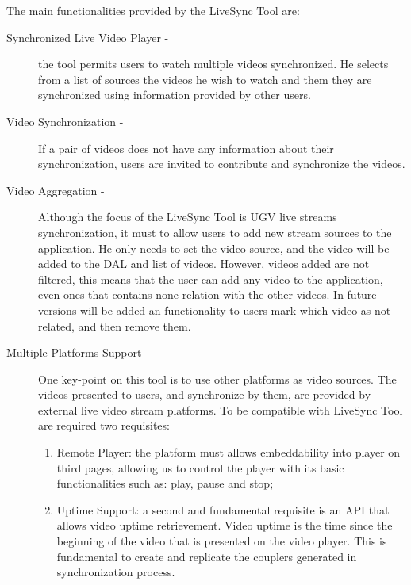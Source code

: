 The main functionalities provided by the LiveSync Tool are:

\begin{description}
	\item[Synchronized Live Video Player -]	the tool permits users to watch multiple videos synchronized. He selects from a list of sources the videos he wish to watch and them they are synchronized using information provided by other users.
	
	\item[Video Synchronization -] If a pair of videos does not have any information about their synchronization, users are invited to contribute and synchronize the videos.
	
		
	\item[Video Aggregation -]	Although the focus of the LiveSync Tool is UGV live streams synchronization, it must to allow users to add new stream sources to the application. He only needs to set the video source, and the video will be added to the DAL and list of videos. However, videos added are not filtered, this means that the user can add any video to the application, even ones that contains none relation with the other videos. In future versions will be added an functionality to users mark which video as not related, and then remove them.
	
	\item[Multiple Platforms Support -] One key-point on this tool is to use other platforms as video sources. The videos presented to users, and synchronize by them, are provided by external live video stream platforms. To be compatible with LiveSync Tool are required two requisites:
	\begin{enumerate}
		\item Remote Player: the platform must allows embeddability into player on third pages, allowing us to control the player with its basic functionalities such as: play, pause and stop;
		\item Uptime Support: a second and fundamental requisite is an API that allows video uptime retrievement. Video uptime is the time since the beginning of the video that is presented on the video player. This is fundamental to create and replicate the couplers generated in synchronization process.
	\end{enumerate}
	

\end{description}
